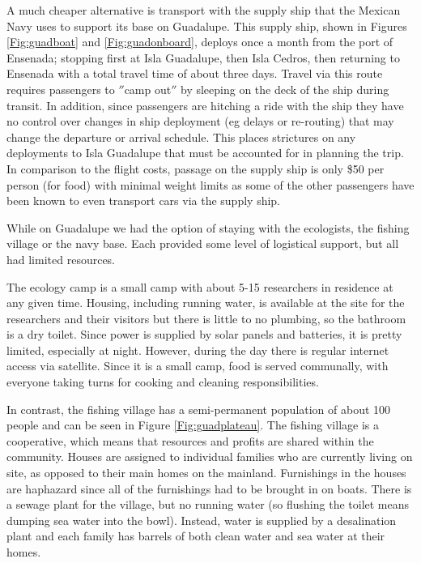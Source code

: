 A much cheaper alternative is transport with the supply ship that the Mexican Navy uses to support its base on Guadalupe. This supply ship, shown in Figures \ref{Fig:guadboat} and \ref{Fig:guadonboard}, deploys once a month from the port of Ensenada; stopping first at Isla Guadalupe, then Isla Cedros, then returning to Ensenada with a total travel time of about three days. Travel via this route requires passengers to $''$camp out$''$ by sleeping on the deck of the ship during transit. In addition, since passengers are hitching a ride with the ship they have no control over changes in ship deployment (eg delays or re-routing) that may change the departure or arrival schedule. This places strictures on any deployments to Isla Guadalupe that must be accounted for in planning the trip. In comparison to the flight costs, passage on the supply ship is only \$50 per person (for food) with minimal weight limits as some of the other passengers have been known to even transport cars via the supply ship. 

While on Guadalupe we had the option of staying with the ecologists, the fishing village or the navy base. Each provided some level of logistical support, but all had limited resources. 

The ecology camp is a small camp with about 5-15 researchers in residence at any given time. Housing, including running water, is available at the site for the researchers and their visitors but there is little to no plumbing, so the bathroom is a dry toilet.  Since power is supplied by solar panels and batteries, it is pretty limited, especially at night. However, during the day there is regular internet access via satellite. Since it is a small camp, food is served communally, with everyone taking turns for cooking and cleaning responsibilities. 

In contrast, the fishing village has a semi-permanent population of about 100 people and can be seen in Figure \ref{Fig:guadplateau}. The fishing village is a cooperative, which means that resources and profits are shared within the community. Houses are assigned to individual families who are currently living on site, as opposed to their main homes on the mainland. Furnishings in the houses are haphazard since all of the furnishings had to be brought in on boats. There is a sewage plant for the village, but no running water (so flushing the toilet means dumping sea water into the bowl). Instead, water is supplied by a desalination plant and each family has barrels of both clean water and sea water at their homes. 

